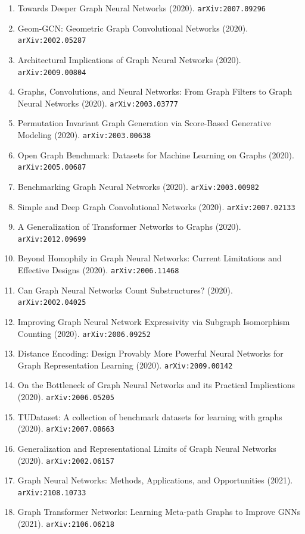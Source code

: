 \documentclass[11pt]{article}
\begin{document}
\begin{enumerate}
  \item Towards Deeper Graph Neural Networks (2020). \texttt{arXiv:2007.09296}
  \item Geom-GCN: Geometric Graph Convolutional Networks (2020). \texttt{arXiv:2002.05287}
  \item Architectural Implications of Graph Neural Networks (2020). \texttt{arXiv:2009.00804}
  \item Graphs, Convolutions, and Neural Networks: From Graph Filters to Graph
  Neural Networks (2020). \texttt{arXiv:2003.03777}
  \item Permutation Invariant Graph Generation via Score-Based Generative
  Modeling (2020). \texttt{arXiv:2003.00638}
  \item Open Graph Benchmark: Datasets for Machine Learning on Graphs (2020). \texttt{arXiv:2005.00687}
  \item Benchmarking Graph Neural Networks (2020). \texttt{arXiv:2003.00982}
  \item Simple and Deep Graph Convolutional Networks (2020). \texttt{arXiv:2007.02133}
  \item A Generalization of Transformer Networks to Graphs (2020). \texttt{arXiv:2012.09699}
  \item Beyond Homophily in Graph Neural Networks: Current Limitations and
  Effective Designs (2020). \texttt{arXiv:2006.11468}
  \item Can Graph Neural Networks Count Substructures? (2020). \texttt{arXiv:2002.04025}
  \item Improving Graph Neural Network Expressivity via Subgraph Isomorphism
  Counting (2020). \texttt{arXiv:2006.09252}
  \item Distance Encoding: Design Provably More Powerful Neural Networks for
  Graph Representation Learning (2020). \texttt{arXiv:2009.00142}
  \item On the Bottleneck of Graph Neural Networks and its Practical
  Implications (2020). \texttt{arXiv:2006.05205}
  \item TUDataset: A collection of benchmark datasets for learning with graphs (2020). \texttt{arXiv:2007.08663}
  \item Generalization and Representational Limits of Graph Neural Networks (2020). \texttt{arXiv:2002.06157}
  \item Graph Neural Networks: Methods, Applications, and Opportunities (2021). \texttt{arXiv:2108.10733}
  \item Graph Transformer Networks: Learning Meta-path Graphs to Improve GNNs (2021). \texttt{arXiv:2106.06218}

\end{enumerate}
\end{document}
